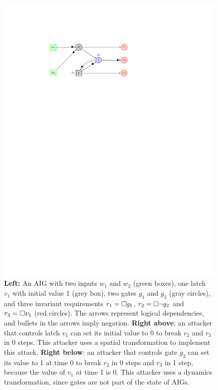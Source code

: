 \begin{figure}[!t]
\begin{minipage}{0.35\textwidth}
\begin{framed}
	\includegraphics[width=\textwidth]{Attack1.pdf}
	\end{framed}
	\end{minipage}
	\caption{\textbf{Left:} An AIG with two
	inputs $w_1$ and $w_2$ (green boxes), one latch $v_1$ with initial value 1 (grey box), two gates $g_1$ and $g_2$ (gray circles), and three invariant requirements $r_1={{\square}} g_1$, $r_2={{\square}} \lnot g_2$ and $r_3={{\square}} v_1$ (red circles). 
	The arrows represent logical dependencies, and bullets in the arrows imply negation.
	\textbf{Right above}: an attacker that controls latch $v_1$ can set its initial value to 0 to break $r_2$ and $r_3$ in 0 steps. This attacker uses a spatial transformation to implement this attack.
	\textbf{Right below}: an attacker that controls gate $g_2$ can set its value to 1 at time 0 to break $r_2$ in 0 steps and $r_3$ in 1 step, because the value of $v_1$ at time 1 is 0. This attacker uses a dynamics transformation, since gates are not part of the state of AIGs.}%
	\label{fig:Classification:Example}
	\end{figure}

